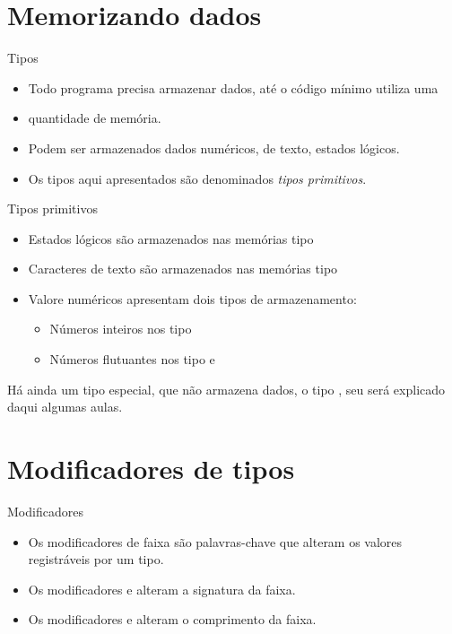 \documentclass[11pt]{beamer}
\subtitle{Tipo assim\dots}
\begin{document}
\titlepage

\begin{frame}
	\tableofcontents
\end{frame}

\section{Memorizando dados}
	\begin{frame}{Tipos}
		\begin{itemize}
			\presentationPause\item Todo programa precisa armazenar dados, até o código mínimo utiliza uma \presentationPause\item quantidade de memória.
			\presentationPause\item Podem ser armazenados dados numéricos, de texto, estados lógicos.
			\presentationPause\item Os tipos aqui apresentados são denominados \emph{tipos primitivos}.
		\end{itemize}
	\end{frame}

	\begin{frame}{Tipos primitivos}
		\begin{itemize}
			\presentationPause\item Estados lógicos são armazenados nas memórias tipo 
			\presentationPause\item Caracteres de texto são armazenados nas memórias tipo 
			\presentationPause\item Valore numéricos apresentam dois tipos de armazenamento:
			\begin{itemize}
				\presentationPause\item Números inteiros nos tipo 
				\presentationPause\item Números flutuantes nos tipo  e 
			\end{itemize}
		\end{itemize}
		\presentationPause Há ainda um tipo especial, que não armazena dados, o tipo , seu será explicado daqui algumas aulas.
	\end{frame}

	\section{Modificadores de tipos}
	\begin{frame}{Modificadores}
		\begin{itemize}
			\presentationPause\item Os modificadores de faixa são palavras-chave que alteram os valores registráveis por um tipo.
			\presentationPause\item Os modificadores  e  alteram a signatura da faixa.
			\presentationPause\item Os modificadores  e  alteram o comprimento da faixa.
		\end{itemize}
	\end{frame}
\end{document}
